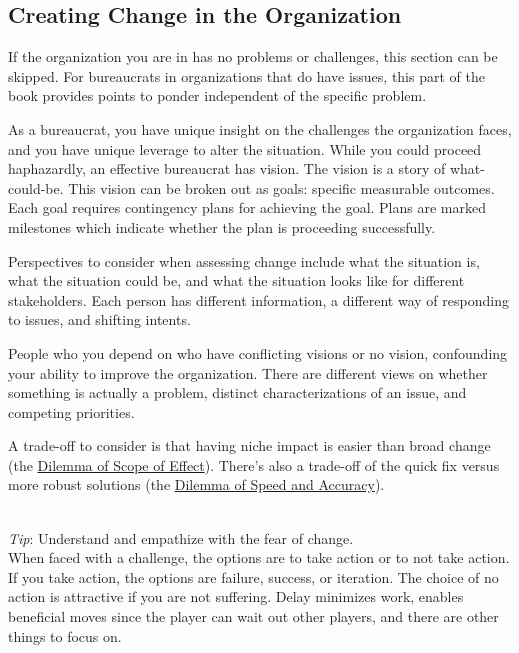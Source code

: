 \subsection*{Creating Change in the Organization\label{sec:creating-change}}

If the organization you are in has no problems or challenges, this section can be skipped. For bureaucrats in organizations that do have issues, this part of the book provides points to ponder independent of the specific problem.

As a bureaucrat, you have unique insight on the challenges the organization faces, and you have unique leverage to alter the situation.  While you could proceed haphazardly, an effective bureaucrat has vision. The vision is a story of what-could-be. This vision can be broken out as goals: specific measurable outcomes. Each goal requires contingency plans for achieving the goal. Plans are marked milestones which indicate whether the plan is proceeding successfully. 

Perspectives to consider when assessing change include what the situation is, what the situation could be, and what the situation looks like for different stakeholders. Each person has different information, a different way of responding to issues, and shifting intents.

People who you depend on who have conflicting visions or no vision, confounding your ability to improve the organization. There are different views on whether something is actually a problem, distinct characterizations of an issue, and competing priorities.

A trade-off to consider is that having niche impact is easier than broad change (the \hyperref[table:scope-broad-vs-narrow]{Dilemma of Scope of Effect}). There's also a trade-off of the quick fix versus more robust solutions (the \hyperref[table:quick-methodical]{Dilemma of Speed and Accuracy}).




\ \\
\textit{Tip}: Understand and empathize with the fear of change. \\
When faced with a challenge, the options are to take action or to not take action. If you take action, the options are failure, success, or iteration. 
The choice of no action is attractive if you are not suffering. Delay minimizes work, enables beneficial moves since the player can wait out other players, and there are other things to focus on.

